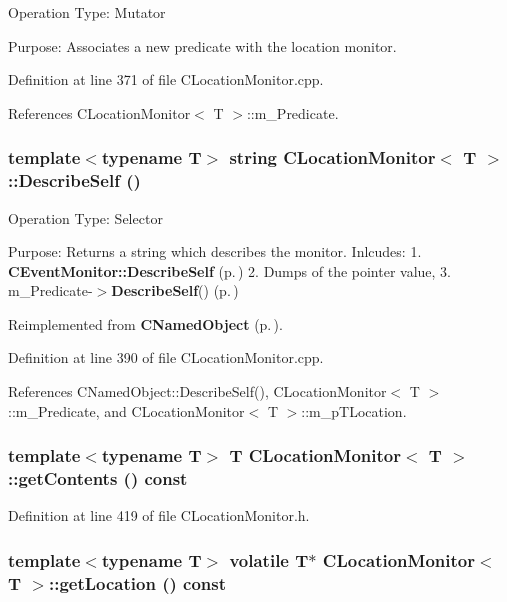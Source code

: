 Operation Type: Mutator

Purpose: Associates a new predicate with the  location monitor. 

Definition at line 371 of file CLocation\-Monitor.cpp.

References CLocation\-Monitor$<$ T $>$::m\_\-Predicate.
\subsubsection{\setlength{\rightskip}{0pt plus 5cm}template$<$typename T$>$ string CLocation\-Monitor$<$ T $>$::Describe\-Self ()\hspace{0.3cm}{\tt  [virtual]}}\label{classCLocationMonitor_a11}


Operation Type: Selector

Purpose: Returns a string which describes the monitor. Inlcudes: 1. {\bf CEvent\-Monitor::Describe\-Self} {\rm (p.\,\pageref{classCNamedObject_a8})} 2. Dumps of the pointer value, 3. m\_\-Predicate-$>${\bf Describe\-Self}() {\rm (p.\,\pageref{classCLocationMonitor_a11})} 

Reimplemented from {\bf CNamed\-Object} {\rm (p.\,\pageref{classCNamedObject_a8})}.

Definition at line 390 of file CLocation\-Monitor.cpp.

References CNamed\-Object::Describe\-Self(), CLocation\-Monitor$<$ T $>$::m\_\-Predicate, and CLocation\-Monitor$<$ T $>$::m\_\-p\-TLocation.
\subsubsection{\setlength{\rightskip}{0pt plus 5cm}template$<$typename T$>$ T CLocation\-Monitor$<$ T $>$::get\-Contents () const\hspace{0.3cm}{\tt  [inline]}}\label{classCLocationMonitor_a10}




Definition at line 419 of file CLocation\-Monitor.h.
\subsubsection{\setlength{\rightskip}{0pt plus 5cm}template$<$typename T$>$ volatile T$\ast$ CLocation\-Monitor$<$ T $>$::get\-Location () const\hspace{0.3cm}{\tt  [inline]}}\label{classCLocationMonitor_a5}





